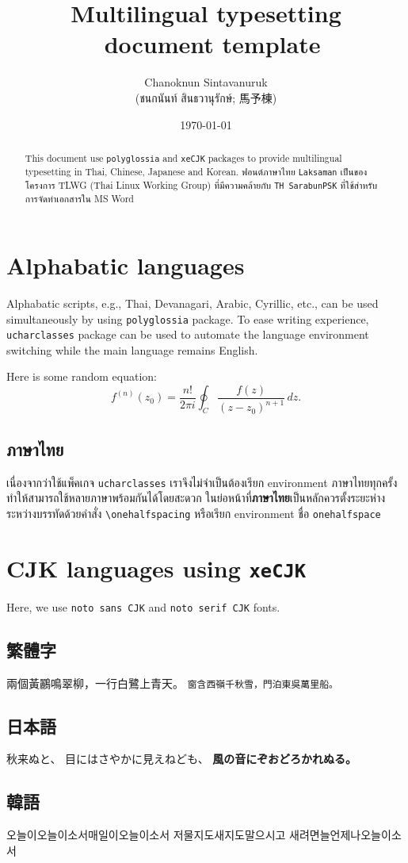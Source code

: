 \documentclass{article}
\title{Multilingual typesetting \XeTeX ~document template}
\author[1]{Chanoknun Sintavanuruk \\ (\textthai{ชนกนันท์ สินธวานุรักษ์}; 馬予棟)}
\date{\today}
\numberwithin{equation}{section} %
\begin{document}
\sloppy %
\maketitle
\begin{abstract}
	This document use \texttt{polyglossia} and \texttt{xeCJK} packages to provide multilingual typesetting in Thai, Chinese, Japanese and Korean. 
	ฟอนต์ภาษาไทย \textenglish{\texttt{Laksaman}} เป็นของโครงการ \textenglish{TLWG (Thai Linux Working Group)} ที่มีความคล้ายกับ \textenglish{\texttt{TH SarabunPSK}} ที่ใช้สำหรับการจัดทำเอกสารใน MS Word	
\end{abstract}

\section{Alphabatic languages}
Alphabatic scripts, e.g., Thai, Devanagari, Arabic, Cyrillic, etc., can be used simultaneously by using \texttt{polyglossia} package.
To ease writing experience, \texttt{ucharclasses} package can be used to automate the language environment switching while the main language remains English.

Here is some random equation:
\begin{equation}
	f^{(n)}(z_0)=\frac{n!}{2\pi i}\oint_C \frac{f(z)}{(z-z_0)^{n+1}}\,dz.
\end{equation}

\subsection{ภาษาไทย}
\begin{onehalfspace}
	เนื่องจากว่าใช้แพ็คเกจ \texttt{ucharclasses} เราจึงไม่จำเป็นต้องเรียก environment ภาษาไทยทุกครั้ง ทำให้สามารถใช้หลายภาษาพร้อมกันได้โดยสะดวก
	ในย่อหน้าที่\textbf{ภาษาไทย}เป็นหลักควรตั้งระยะห่างระหว่างบรรทัดด้วยคำสั่ง \texttt{\textbackslash onehalfspacing} หรือเรียก environment ชื่อ \texttt{onehalfspace}
\end{onehalfspace}

\section{CJK languages using \texttt{xeCJK}}
Here, we use \texttt{noto sans CJK} and \texttt{noto serif CJK} fonts.
\subsection{繁體字}
兩個黃鸝鳴翠柳，一行白鷺上青天。
\texttt{窗含西嶺千秋雪，門泊東吳萬里船。}

{
\subsection{日本語}
秋来ぬと、
目にはさやかに見えねども、
\textbf{風の音にぞおどろかれぬる。}
}

\subsection{韓語}
오늘이오늘이소서매일이오늘이소서
저물지도새지도말으시고
새려면늘언제나오늘이소서
\end{document}
